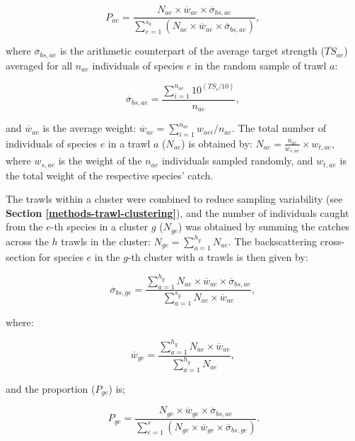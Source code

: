 \documentclass[]{article}
\begin{document}
\begin{equation}
 P_{ae} = \frac{N_{ae} \times \overline{w}_{ae} \times \overline{\sigma}_{bs,ae}}{\sum_{e=1}^{s_a} (N_{ae} \times \overline{w}_{ae} \times \overline{\sigma}_{bs,ae})}\text{, }
  \label{eq:acoustic-prop-spp}
\end{equation}

where \(\overline{\sigma}_{bs,ae}\) is the arithmetic counterpart of the average target strength (\(\overline{TS}_{ae}\)) averaged for all \(n_{ae}\) individuals of species \(e\) in the random sample of trawl \(a\):

\begin{equation}
  \overline{\sigma}_{bs,ae} = \frac{\sum_{i=1}^{n_{ae}}10^{(TS_i/10)}}{n_{ae}}\text{, }
  \label{eq:avg-ts-all-spp}
\end{equation}

and \(\overline{w}_{ae}\) is the average weight: \(\overline{w}_{ae} = \sum_{i=1}^{n_{ae}}{w_{aei}}/{n_{ae}}\). The total number of individuals of species \(e\) in a trawl \(a\) (\(N_{ae}\)) is obtained by: \(N_{ae}=\frac{n_{ae}}{w_{s,ae}} \times w_{t,ae}\), where \(w_{s,ae}\) is the weight of the \(n_{ae}\) individuals sampled randomly, and \(w_{t,ae}\) is the total weight of the respective species' catch.

The trawls within a cluster were combined to reduce sampling variability (see \textbf{Section \ref{methods-trawl-clustering}}), and the number of individuals caught from the \(e\)-th species in a cluster \(g\) (\(N_{ge}\)) was obtained by summing the catches across the \(h\) trawls in the cluster: \(N_{ge}=\sum_{a=1}^{h_g}N_{ae}\). The backscattering cross-section for species \(e\) in the \(g\)-th cluster with \(a\) trawls is then given by:

\begin{equation}
  \overline{\sigma}_{bs,ge}=\frac{\sum_{a=1}^{h_g} N_{ae} \times \overline{w}_{ae} \times \overline{\sigma}_{bs,ae}}{\sum_{a=1}^{s_g} N_{ae} \times \overline{w}_{ae}}\text{, }
  \label{eq:sigma-spp-j}
\end{equation}

where:

\begin{equation}
  \overline{w}_{ge} = \frac{\sum_{a=1}^{h_g} N_{ae} \times \overline{w}_{ae}}{\sum_{a=1}^{h_g} N_{ae}}\text{, }
  \label{eq:w-spp-j}
\end{equation}

and the proportion (\(P_{ge}\)) is;

\begin{equation}
  P_{ge} = \frac{N_{ge} \times \overline{w}_{ge} \times \overline{\sigma}_{bs,ae}}{\sum_{e=1}^{s}(N_{ge} \times \overline{w}_{ge} \times \overline{\sigma}_{bs,ge})}\text{.}
  \label{eq:prop-spp-j}
\end{equation}
\end{document}
